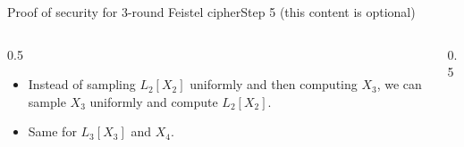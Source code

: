 \ifdefined\PRESENTATION\else\PassOptionsToClass{handout}{beamer}\fi\documentclass[aspectratio=169, lualatex]{beamer}
\begin{document}
	\begin{frame}{Proof of security for 3-round Feistel cipher}{Step 5 (this content is optional)}
		\begin{columns}[c]
			\begin{column}{0.5\textwidth}
				\begin{itemize}
					\item Instead of sampling $L_2[X_2]$ uniformly and then computing $X_3$, we can sample $X_3$ uniformly and compute $L_2[X_2]$.
					\item Same for $L_3[X_3]$ and $X_4$.
				\end{itemize}
			\end{column}
			\begin{column}{0.5\textwidth}
				\vspace{-1.5cm}
				\begin{center}
				\end{center}
			\end{column}
		\end{columns}
	\end{frame}
\end{document}
